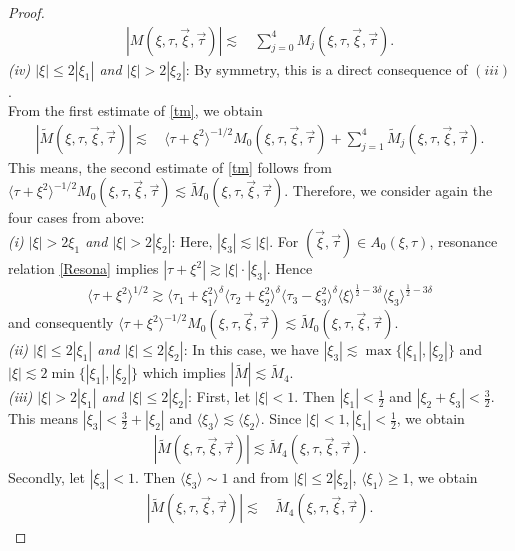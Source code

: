 \documentclass[reqno]{amsart}
\theoremstyle{Definitionl}
\theoremstyle{Definitionk}
\theoremstyle{definition}
\theoremstyle{Satzk}
\theoremstyle{Satzl}
\theoremstyle{Bemerkung}
\begin{document}
\begin{proof}
\begin{align*}
|M(\xi,\tau,\vec\xi,\vec\tau)|\lesssim&\, \sum_{j=0}^4M_j(\xi,\tau,\vec\xi,\vec\tau).
\end{align*}
\emph{(iv) $|\xi|\le2|\xi_1|$ and $|\xi|>2|\xi_2|$}: By symmetry, this is a direct consequence of $(iii)$.\\[10pt]
From the first estimate of \eqref{tm}, we obtain 
\begin{align*}
|\tilde M(\xi,\tau,\vec\xi,\vec\tau)|\lesssim&\, \langle\tau+\xi^2\rangle^{-1/2}M_0(\xi,\tau,\vec\xi,\vec\tau)+\sum_{j=1}^4\tilde M_j(\xi,\tau,\vec\xi,\vec\tau).
\end{align*}
This means, the second estimate of \eqref{tm} follows from $\langle\tau+\xi^2\rangle^{-1/2}M_0(\xi,\tau,\vec\xi,\vec\tau)\lesssim \tilde M_0(\xi,\tau,\vec\xi,\vec\tau)$. Therefore, we consider again the four cases from above:\\[10pt]
\emph{(i) $|\xi|>2\xi_1$ and $|\xi|>2|\xi_2|$}: Here, $|\xi_3|\lesssim|\xi|$. For $(\vec\xi,\vec\tau)\in A_0(\xi,\tau)$, resonance relation \eqref{Resona} implies $|\tau+\xi^2|\gtrsim |\xi|\cdot|\xi_3|$. Hence
\begin{align*}
\langle\tau+\xi^2\rangle^{1/2}\gtrsim \langle\tau_1+\xi_1^2\rangle^{\delta}\langle\tau_2+\xi_2^2\rangle^{\delta}\langle\tau_3-\xi_3^2\rangle^{\delta}\langle\xi\rangle^{\frac12-3\delta}\langle\xi_3\rangle^{\frac12-3\delta}
\end{align*}
and consequently $\langle\tau+\xi^2\rangle^{-1/2}M_0(\xi,\tau,\vec\xi,\vec\tau)\lesssim \tilde M_0(\xi,\tau,\vec\xi,\vec\tau)$.\\[10pt]
\emph{(ii) $|\xi|\le2|\xi_1|$ and $|\xi|\le2|\xi_2|$}: In this case, we have $|\xi_3|\lesssim\max\{|\xi_1|,|\xi_2|\}$ and $|\xi|\lesssim 2\min\{|\xi_1|,|\xi_2|\}$ which implies $|\tilde M|\lesssim \tilde M_4$.\\[10pt]
\emph{(iii) $|\xi|>2|\xi_1|$ and $|\xi|\le 2|\xi_2|$}: First, let $|\xi|<1$. Then $|\xi_1|<\tfrac12$ and $|\xi_2+\xi_3|<\tfrac32$. This means $|\xi_3|< \tfrac32+|\xi_2|$ and $\langle\xi_3\rangle\lesssim\langle\xi_2\rangle$. Since $|\xi|<1,|\xi_1|<\tfrac12$, we obtain
\begin{align*}
|\tilde M(\xi,\tau,\vec\xi,\vec\tau)|\lesssim \tilde M_4(\xi,\tau,\vec\xi,\vec\tau).
\end{align*}
Secondly, let $|\xi_3|<1$. Then $\langle\xi_3\rangle\sim 1$ and from $|\xi|\le2|\xi_2|$, $\langle\xi_1\rangle\ge1$, we obtain
\begin{align*}
|\tilde M(\xi,\tau,\vec\xi,\vec\tau)|\lesssim&\, \tilde M_4(\xi,\tau,\vec\xi,\vec\tau).

\end{align*}
\end{proof}
\end{document}
